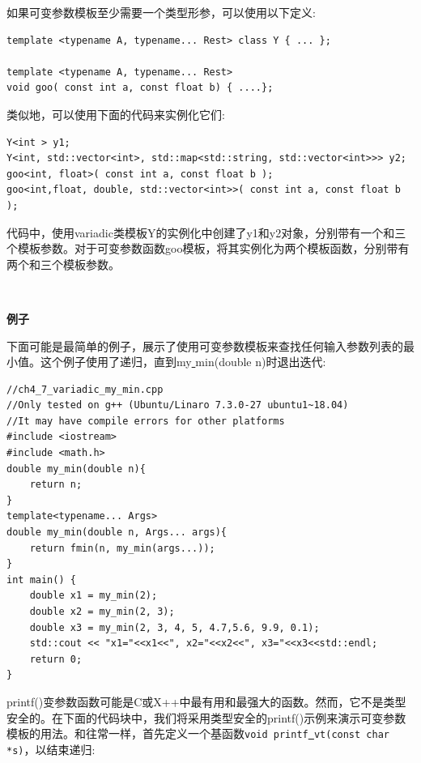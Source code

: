 如果可变参数模板至少需要一个类型形参，可以使用以下定义: \par

\begin{lstlisting}[caption={}]
template <typename A, typename... Rest> class Y { ... };

template <typename A, typename... Rest>
void goo( const int a, const float b) { ....};
\end{lstlisting}

类似地，可以使用下面的代码来实例化它们: \par

\begin{lstlisting}[caption={}]
Y<int > y1;
Y<int, std::vector<int>, std::map<std::string, std::vector<int>>> y2;
goo<int, float>( const int a, const float b );
goo<int,float, double, std::vector<int>>( const int a, const float b );
\end{lstlisting}

代码中，使用variadic类模板Y的实例化中创建了y1和y2对象，分别带有一个和三个模板参数。对于可变参数函数goo模板，将其实例化为两个模板函数，分别带有两个和三个模板参数。 \par

\noindent\textbf{}\ \par
\textbf{例子} \ \par
下面可能是最简单的例子，展示了使用可变参数模板来查找任何输入参数列表的最小值。这个例子使用了递归，直到my\underline{ }min(double n)时退出迭代: \par

\begin{lstlisting}[caption={}]
//ch4_7_variadic_my_min.cpp
//Only tested on g++ (Ubuntu/Linaro 7.3.0-27 ubuntu1~18.04)
//It may have compile errors for other platforms
#include <iostream>
#include <math.h>
double my_min(double n){
	return n;
}
template<typename... Args>
double my_min(double n, Args... args){
	return fmin(n, my_min(args...));
}
int main() {
	double x1 = my_min(2);
	double x2 = my_min(2, 3);
	double x3 = my_min(2, 3, 4, 5, 4.7,5.6, 9.9, 0.1);
	std::cout << "x1="<<x1<<", x2="<<x2<<", x3="<<x3<<std::endl;
	return 0;
}
\end{lstlisting}

printf()变参数函数可能是C或X++中最有用和最强大的函数。然而，它不是类型安全的。在下面的代码块中，我们将采用类型安全的printf()示例来演示可变参数模板的用法。和往常一样，首先定义一个基函数\texttt{void printf\underline{ }vt(const char *s)}，以结束递归: \par


